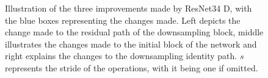 \begin{figure}[htbp]
    \caption{Illustration of the three improvements made by ResNet34 D, with the blue boxes representing the changes made. Left depicts the change made to the residual path of the downsampling block, middle illustrates the changes made to the initial block of the network and right explains the changes to the downsampling identity path. $s$ represents the stride of the operations, with it being one if omitted. \cite{heBagTricksImage2018}}
    \label{fig:resnet34d}
\end{figure}

